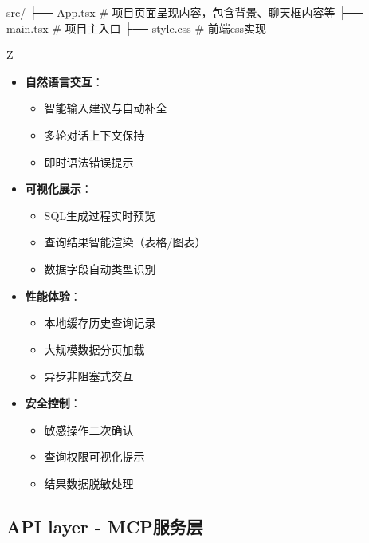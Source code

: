 \documentclass{article}
\begin{document}
	\begin{filetree}
        src/
        ├── App.tsx   # 项目页面呈现内容，包含背景、聊天框内容等
        ├── main.tsx  # 项目主入口
        ├── style.css # 前端css实现
	\end{filetree}
	
	\begin{tcolorbox}[
		title=关键能力,
		colback=white,
		colframe=blue!50,
		fonttitle=\bfseries,
		coltitle=black,
		breakable
		]Z
		\begin{itemize}
			\item[\textcolor{purple}{\textbullet}] \textbf{自然语言交互}：
			\begin{itemize}
				\item 智能输入建议与自动补全
				\item 多轮对话上下文保持
				\item 即时语法错误提示
			\end{itemize}
			
			\item[\textcolor{purple}{\textbullet}] \textbf{可视化展示}：
			\begin{itemize}
				\item SQL生成过程实时预览
				\item 查询结果智能渲染（表格/图表）
				\item 数据字段自动类型识别
			\end{itemize}
			
			\item[\textcolor{purple}{\textbullet}] \textbf{性能体验}：
			\begin{itemize}
				\item 本地缓存历史查询记录
				\item 大规模数据分页加载
				\item 异步非阻塞式交互
			\end{itemize}
			
			\item[\textcolor{purple}{\textbullet}] \textbf{安全控制}：
			\begin{itemize}
				\item 敏感操作二次确认
				\item 查询权限可视化提示
				\item 结果数据脱敏处理
			\end{itemize}
		\end{itemize}
	\end{tcolorbox}
	
	\subsection{API layer - MCP服务层}
	
\end{document}
